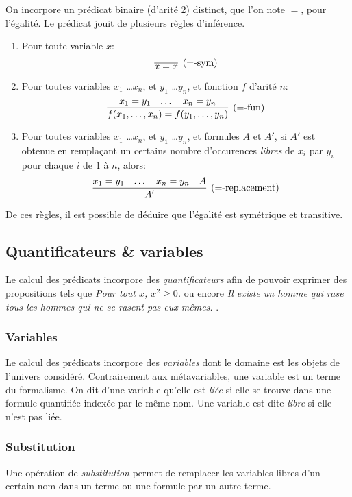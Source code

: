 On incorpore un prédicat binaire (d'arité 2) distinct, que l'on note ${=}$, pour l'égalité.
Le prédicat jouit de plusieurs règles d'inférence.
\begin{enumerate}
\item Pour toute variable $x$:
\[
\infer[({=}\text{-sym})]{x = x}{}
\]
\item Pour toutes variables $x_1$ \dots $x_n$, et $y_1$ \dots $y_n$, et fonction $f$ d'arité $n$:
\[
\infer[({=}\text{-fun})]{f(x_1, \dots, x_n) = f(y_1, \dots, y_n)}{x_1 = y_1 & \dots & x_n = y_n}
\]
\item Pour toutes variables  $x_1$ \dots $x_n$, et $y_1$ \dots $y_n$, et formules $A$ et $A'$, si $A'$ est obtenue en remplaçant un certains nombre d'occurences \textit{libres} de $x_i$ par $y_i$ pour chaque $i$ de $1$ à $n$, alors:
\[
\infer[({=}\text{-replacement})]{A'}{x_1 = y_1 & \dots & x_n = y_n & A}
\]
\end{enumerate}

De ces règles, il est possible de déduire que l'égalité est symétrique et transitive. 


\subsection{Quantificateurs \& variables}

Le calcul des prédicats incorpore des \og \textit{quantificateurs} \fg{} afin de pouvoir exprimer des propositions tels que \og \textit{Pour tout $x$, $x^2 \geq 0$.} \fg{} ou encore \og \textit{Il existe un homme qui rase tous les hommes qui ne se rasent pas eux-mêmes.} \fg{}.

\subsubsection{Variables}

Le calcul des prédicats incorpore des \og \textit{variables} \fg{} dont le domaine est les objets de l'univers considéré.
Contrairement aux métavariables, une variable est un terme du formalisme.
On dit d'une variable qu'elle est \og \textit{liée} \fg{} si elle se trouve dans une formule quantifiée indexée par le même nom.
Une variable est dite \og \textit{libre} \fg{} si elle n'est pas liée.

\subsubsection{Substitution}

Une opération de \og \textit{substitution} \fg{} permet de remplacer les variables libres d'un certain nom dans un terme ou une formule par un autre terme.

